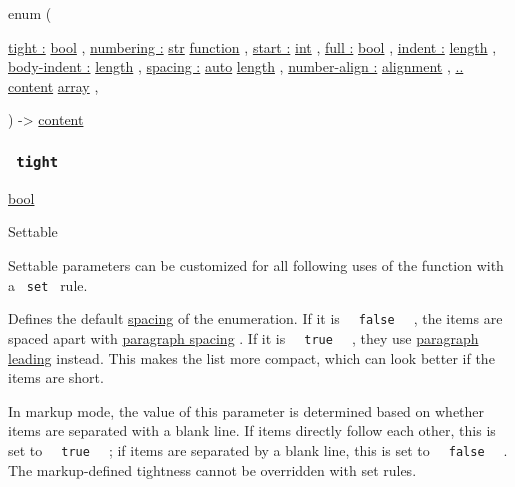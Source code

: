 { enum } (

{ \hyperref[parameters-tight]{tight :}
\href{/docs/reference/foundations/bool/}{bool} , } {
\hyperref[parameters-numbering]{numbering :}
\href{/docs/reference/foundations/str/}{str}
\href{/docs/reference/foundations/function/}{function} , } {
\hyperref[parameters-start]{start :}
\href{/docs/reference/foundations/int/}{int} , } {
\hyperref[parameters-full]{full :}
\href{/docs/reference/foundations/bool/}{bool} , } {
\hyperref[parameters-indent]{indent :}
\href{/docs/reference/layout/length/}{length} , } {
\hyperref[parameters-body-indent]{body-indent :}
\href{/docs/reference/layout/length/}{length} , } {
\hyperref[parameters-spacing]{spacing :}
\href{/docs/reference/foundations/auto/}{auto}
\href{/docs/reference/layout/length/}{length} , } {
\hyperref[parameters-number-align]{number-align :}
\href{/docs/reference/layout/alignment/}{alignment} , } {
\hyperref[parameters-children]{..}
\href{/docs/reference/foundations/content/}{content}
\href{/docs/reference/foundations/array/}{array} , }

) -\textgreater{} \href{/docs/reference/foundations/content/}{content}

\subsubsection{\texorpdfstring{\texttt{\ tight\ }}{ tight }}\label{parameters-tight}

\href{/docs/reference/foundations/bool/}{bool}

{{ Settable }}

\label{parameters-tight-settable-tooltip}
Settable parameters can be customized for all following uses of the
function with a \texttt{\ set\ } rule.

Defines the default
\href{/docs/reference/model/enum/\#parameters-spacing}{spacing} of the
enumeration. If it is \texttt{\ }{\texttt{\ false\ }}\texttt{\ } , the
items are spaced apart with
\href{/docs/reference/model/par/\#parameters-spacing}{paragraph spacing}
. If it is \texttt{\ }{\texttt{\ true\ }}\texttt{\ } , they use
\href{/docs/reference/model/par/\#parameters-leading}{paragraph leading}
instead. This makes the list more compact, which can look better if the
items are short.

In markup mode, the value of this parameter is determined based on
whether items are separated with a blank line. If items directly follow
each other, this is set to \texttt{\ }{\texttt{\ true\ }}\texttt{\ } ;
if items are separated by a blank line, this is set to
\texttt{\ }{\texttt{\ false\ }}\texttt{\ } . The markup-defined
tightness cannot be overridden with set rules.


